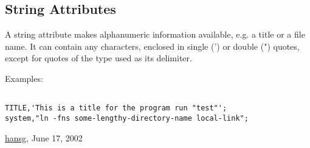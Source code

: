 




\subsection{String Attributes}
  A string attribute makes alphanumeric information available, e.g. a title or a file name. It can contain any characters, enclosed in single (') or double (") quotes, except for quotes of the type used as its delimiter. 

 Examples: 
\begin{verbatim}

TITLE,'This is a title for the program run "test"';
system,"ln -fns some-lengthy-directory-name local-link";
\end{verbatim}\href{http://www.cern.ch/Hans.Grote/hansg_sign.html}{hansg}, June 17, 2002 

